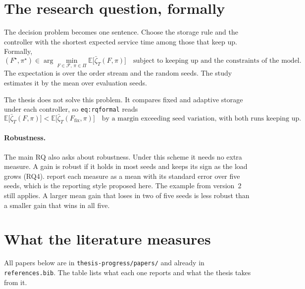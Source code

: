\documentclass[11pt,a4paper]{article}
\begin{document}
\section{The research question, formally}
\label{sec:formal}

The decision problem becomes one sentence. Choose the storage rule and the
controller with the shortest expected service time among those that keep
up. Formally,
\[
  (F^\star,\pi^\star) \in \arg\min_{F\in\mathcal{F},\,\pi\in\Pi}
  \mathbb{E}\bigl[\bar\zeta_T(F,\pi)\bigr]
  \quad\text{subject to keeping up and the constraints of the model.}
\]
The expectation is over the order stream and the random seeds. The study
estimates it by the mean over evaluation seeds.

The thesis does not solve this problem. It compares fixed and adaptive
storage under each controller, so \texttt{eq:rqformal} reads
\[
  \mathbb{E}\bigl[\bar\zeta_T(F,\pi)\bigr] <
  \mathbb{E}\bigl[\bar\zeta_T(F_{\mathrm{fix}},\pi)\bigr]
  \quad\text{by a margin exceeding seed variation, with both runs keeping up.}
\]

\paragraph{Robustness.} The main RQ also asks about robustness. Under this
scheme it needs no extra measure. A gain is robust if it holds in most
seeds and keeps its sign as the load grows (RQ4). \citet{lau2022mapd}
report each measure as a mean with its standard error over five seeds,
which is the reporting style proposed here. The example from version~2
still applies. A larger mean gain that loses in two of five seeds is less
robust than a smaller gain that wins in all five.

\section{What the literature measures}
\label{sec:sources}

All papers below are in \texttt{thesis-progress/papers/} and already in
\texttt{references.bib}. The table lists what each one reports and what
the thesis takes from it.
\end{document}
